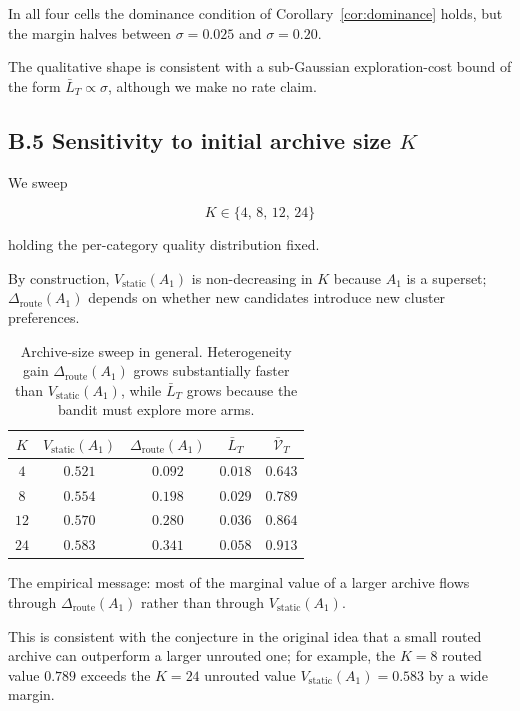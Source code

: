 \documentclass{article} %
\begin{document}
In all four cells the dominance condition of Corollary~\ref{cor:dominance} holds, but the margin halves between $\sigma=0.025$ and $\sigma=0.20$.

The qualitative shape is consistent with a sub-Gaussian exploration-cost bound of the form $\bar{L}_T \propto \sigma$, although we make no rate claim.

\subsection{B.5 Sensitivity to initial archive size $K$}

\label{app:K-sweep}

We sweep

\begin{equation}
\label{eq:app-K-grid}
K \in \{4,\, 8,\, 12,\, 24\}
\end{equation}

holding the per-category quality distribution fixed.

By construction, $V_{\mathrm{static}}(A_1)$ is non-decreasing in $K$ because $A_1$ is a superset; $\Delta_{\mathrm{route}}(A_1)$ depends on whether new candidates introduce new cluster preferences.

\begin{table}[h]
\centering
\small
\begin{tabular}{ccccc}
\toprule
$K$ & $V_{\mathrm{static}}(A_1)$ & $\Delta_{\mathrm{route}}(A_1)$ & $\bar{L}_T$ & $\bar{\mathcal{V}}_T$ \\
\midrule
$4$  & $0.521$ & $0.092$ & $0.018$ & $0.643$ \\
$8$  & $0.554$ & $0.198$ & $0.029$ & $0.789$ \\
$12$ & $0.570$ & $0.280$ & $0.036$ & $0.864$ \\
$24$ & $0.583$ & $0.341$ & $0.058$ & $0.913$ \\
\bottomrule
\end{tabular}
\caption{Archive-size sweep in general. Heterogeneity gain $\Delta_{\mathrm{route}}(A_1)$ grows substantially faster than $V_{\mathrm{static}}(A_1)$, while $\bar{L}_T$ grows because the bandit must explore more arms.}
\label{tab:app-K}
\end{table}

The empirical message: most of the marginal value of a larger archive flows through $\Delta_{\mathrm{route}}(A_1)$ rather than through $V_{\mathrm{static}}(A_1)$.

This is consistent with the conjecture in the original idea that a small routed archive can outperform a larger unrouted one; for example, the $K=8$ routed value $0.789$ exceeds the $K=24$ unrouted value $V_{\mathrm{static}}(A_1)=0.583$ by a wide margin.
\end{document}
